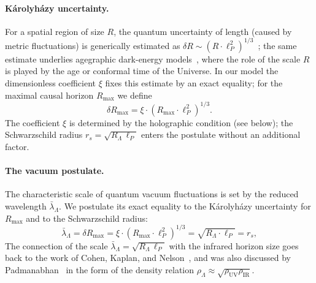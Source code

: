 \documentclass[10pt,a4paper]{article}
\begin{document}
\paragraph{K\'arolyh\'azy uncertainty.} For a spatial region of size $R$, the quantum uncertainty of length (caused by metric fluctuations) is generically estimated as $\delta R \sim (R \cdot \ell_P^2)^{1/3}$~\cite{Karolyhazy1966,Maziashvili2007}; the same estimate underlies agegraphic dark-energy models~\cite{Cai2007,WeiCai2008}, where the role of the scale $R$ is played by the age or conformal time of the Universe. In our model the dimensionless coefficient $\xi$ fixes this estimate by an exact equality; for the maximal causal horizon $R_{\max}$ we define
\begin{equation}
\delta R_{\max} = \xi \cdot (R_{\max} \cdot \ell_P^2)^{1/3}.
\end{equation}
The coefficient $\xi$ is determined by the holographic condition (see below); the Schwarzschild radius $r_s = \sqrt{R_\Lambda\,\ell_P}$ enters the postulate without an additional factor.

\paragraph{The vacuum postulate.} The characteristic scale of quantum vacuum fluctuations is set by the reduced wavelength $\bar\lambda_\Lambda$. We postulate its exact equality to the K\'arolyh\'azy uncertainty for $R_{\max}$ and to the Schwarzschild radius:
\begin{equation}
\boxed{\bar\lambda_\Lambda = \delta R_{\max} = \xi \cdot (R_{\max} \cdot \ell_P^2)^{1/3} = \sqrt{R_\Lambda \cdot \ell_P} = r_s,}
\end{equation}
The connection of the scale $\bar\lambda_\Lambda = \sqrt{R_\Lambda\,\ell_P}$ with the infrared horizon size goes back to the work of Cohen, Kaplan, and Nelson~\cite{Cohen1999}, and was also discussed by Padmanabhan~\cite{Padmanabhan2005} in the form of the density relation $\rho_\Lambda \approx \sqrt{\rho_{\mathrm{UV}}\rho_{\mathrm{IR}}}$.
\end{document}
